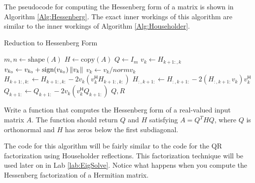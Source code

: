 The pseudocode for computing the Hessenberg form of a matrix is shown in Algorithm \ref{Alg:Hessenberg}.
The exact inner workings of this algorithm are similar to the inner workings of Algorithm \ref{Alg:Householder}.

\begin{algorithm}
\caption{Reduction to Hessenberg Form}
\label{Alg:Hessenberg}
\begin{algorithmic}[1]
\State $m, n \gets \text{shape}(A)$
\State $H \gets \text{copy}(A)$
\State $Q \gets I_m$
    \State $v_k \gets H_{k+1:, k}$
    \State $v_{k_0} \gets v_{k_0} + \text{sign}(v_{k_0}) \left\lVert v_k\right\rVert$
    \State $v_k \gets v_k/norm{v_k}$
    \State $H_{k+1:,k:} \gets H_{k+1:,k:} - 2v_k(v_k^\mathsf{H} H_{k+1:,k:})$
    \State $H_{:,k+1:} \gets H_{:,k+1:} - 2(H_{:,k+1:} v_k) v_k^\mathsf{H}$
    \State $Q_{k+1:} \gets Q_{k+1:} - 2v_k(v_k^\mathsf{H} Q_{k+1:})$
\EndFor
\State {} $Q, R$
\EndProcedure
\end{algorithmic}
\end{algorithm}

\begin{problem}
\label{prob:hessenberg}
Write a function  that computes the Hessenberg form of a real-valued
input matrix $A$. The function should return $Q$ and $H$ satisfying $A = Q^THQ$,
where $Q$ is orthonormal and $H$ has zeros below the first subdiagonal.

The code for this algorithm will be fairly similar to the code for the QR factorization using Householder reflections.
This factorization technique will be used later on in Lab \ref{lab:EigSolve}.
Notice what happens when you compute the Hessenberg factorization of a Hermitian matrix.
\end{problem}


